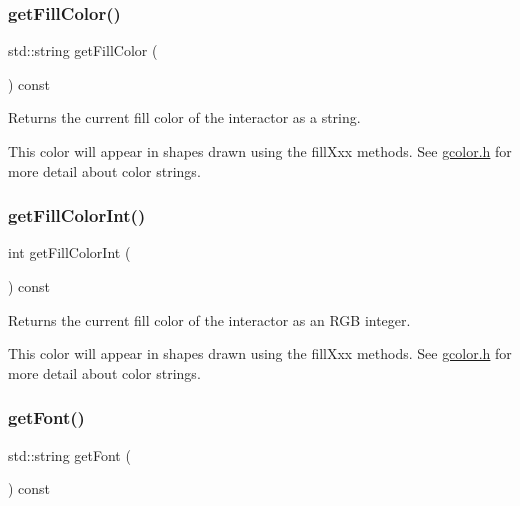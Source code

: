 \subsubsection{\texorpdfstring{get\+Fill\+Color()}{getFillColor()}}
{\footnotesize\ttfamily std\+::string get\+Fill\+Color (\begin{DoxyParamCaption}{ }\end{DoxyParamCaption}) const\hspace{0.3cm}{\ttfamily [virtual]}}



Returns the current fill color of the interactor as a string. 

This color will appear in shapes drawn using the fill\+Xxx methods. See \mbox{\hyperlink{gcolor_8h_source}{gcolor.\+h}} for more detail about color strings. \mbox{\label{classGDrawingSurface_a88f4508d9271c4b5f5b5d6b780f223d0}} 
\subsubsection{\texorpdfstring{get\+Fill\+Color\+Int()}{getFillColorInt()}}
{\footnotesize\ttfamily int get\+Fill\+Color\+Int (\begin{DoxyParamCaption}{ }\end{DoxyParamCaption}) const\hspace{0.3cm}{\ttfamily [virtual]}}



Returns the current fill color of the interactor as an R\+GB integer. 

This color will appear in shapes drawn using the fill\+Xxx methods. See \mbox{\hyperlink{gcolor_8h_source}{gcolor.\+h}} for more detail about color strings. \mbox{\label{classGDrawingSurface_a894a5502900794eeb27d084c21f1d77d}} 
\subsubsection{\texorpdfstring{get\+Font()}{getFont()}}
{\footnotesize\ttfamily std\+::string get\+Font (\begin{DoxyParamCaption}{ }\end{DoxyParamCaption}) const\hspace{0.3cm}{\ttfamily [virtual]}}



